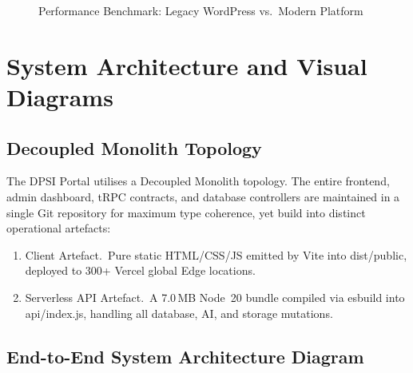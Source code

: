 \documentclass[12pt, a4paper, oneside]{report}
\def\textbf#1{#1}
\def\texttt#1{#1}
\def\&{and}
\begin{document}
\begin{figure}[H]
\caption{Performance Benchmark: Legacy WordPress vs.\ Modern Platform}
\label{fig:performance-benchmark}
\end{figure}


\chapter{System Architecture \texorpdfstring{\&}{and} Visual Diagrams}

\section{Decoupled Monolith Topology}

The DPSI Portal utilises a \textbf{Decoupled Monolith} topology.  The entire
frontend, admin dashboard, tRPC contracts, and database controllers are
maintained in a single Git repository for maximum type coherence, yet build
into distinct operational artefacts:

\begin{enumerate}
  \item \textbf{Client Artefact.}\ Pure static HTML/CSS/JS emitted by Vite into
        \texttt{dist/public}, deployed to 300+ Vercel global Edge locations.
  \item \textbf{Serverless API Artefact.}\ A 7.0\,MB Node~20 bundle compiled
        via \texttt{esbuild} into \texttt{api/index.js}, handling all database,
        AI, and storage mutations.
\end{enumerate}

\section{End-to-End System Architecture Diagram}
\end{document}
